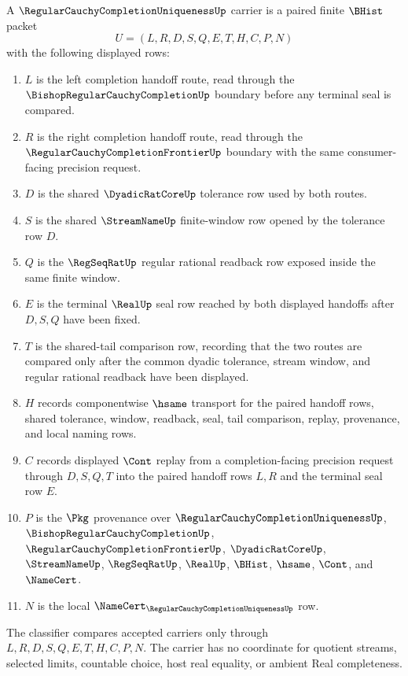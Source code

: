 \begin{definition}
\label{def:regular-cauchy-completion-uniqueness-carrier}
A $\RegularCauchyCompletionUniquenessUp$ carrier is a paired finite $\BHist$ packet
$$
U=(L,R,D,S,Q,E,T,H,C,P,N)
$$
with the following displayed rows:
\begin{enumerate}
\item $L$ is the left completion handoff route, read through the $\BishopRegularCauchyCompletionUp$ boundary before any terminal seal is compared.
\item $R$ is the right completion handoff route, read through the $\RegularCauchyCompletionFrontierUp$ boundary with the same consumer-facing precision request.
\item $D$ is the shared $\DyadicRatCoreUp$ tolerance row used by both routes.
\item $S$ is the shared $\StreamNameUp$ finite-window row opened by the tolerance row $D$.
\item $Q$ is the $\RegSeqRatUp$ regular rational readback row exposed inside the same finite window.
\item $E$ is the terminal $\RealUp$ seal row reached by both displayed handoffs after $D,S,Q$ have been fixed.
\item $T$ is the shared-tail comparison row, recording that the two routes are compared only after the common dyadic tolerance, stream window, and regular rational readback have been displayed.
\item $H$ records componentwise $\hsame$ transport for the paired handoff rows, shared tolerance, window, readback, seal, tail comparison, replay, provenance, and local naming rows.
\item $C$ records displayed $\Cont$ replay from a completion-facing precision request through $D,S,Q,T$ into the paired handoff rows $L,R$ and the terminal seal row $E$.
\item $P$ is the $\Pkg$ provenance over $\RegularCauchyCompletionUniquenessUp$, $\BishopRegularCauchyCompletionUp$, $\RegularCauchyCompletionFrontierUp$, $\DyadicRatCoreUp$, $\StreamNameUp$, $\RegSeqRatUp$, $\RealUp$, $\BHist$, $\hsame$, $\Cont$, and $\NameCert$.
\item $N$ is the local $\NameCert_{\RegularCauchyCompletionUniquenessUp}$ row.
\end{enumerate}
The classifier compares accepted carriers only through $L,R,D,S,Q,E,T,H,C,P,N$. The carrier has no coordinate for quotient streams, selected limits, countable choice, host real equality, or ambient Real completeness.
\end{definition}

